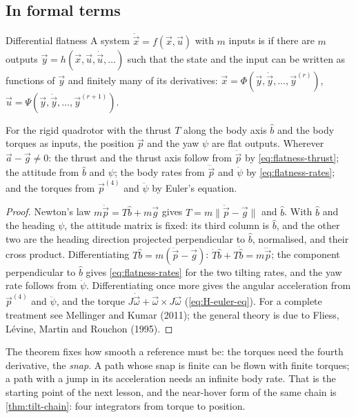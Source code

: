 \subsection{In formal terms}

\begin{definition}{Differential flatness}
A system $\dot{\vec x} = f(\vec x, \vec u)$ with $m$ inputs is  if there are $m$ outputs $\vec y = h(\vec x, \vec u, \dot{\vec u}, \dots)$ such that the state and the input can be written as functions of $\vec y$ and finitely many of its derivatives: $\vec x = \Phi(\vec y, \dot{\vec y}, \dots, \vec y^{(r)})$, $\vec u = \Psi(\vec y, \dot{\vec y}, \dots, \vec y^{(r+1)})$.
\end{definition}

\begin{theorem}
\label{thm:flatness-quad}
For the rigid quadrotor with the thrust $T$ along the body axis $\hat b$ and the body torques as inputs, the position $\vec p$ and the yaw $\psi$ are flat outputs. Wherever $\vec a - \vec g \ne 0$: the thrust and the thrust axis follow from $\ddot{\vec p}$ by \cref{eq:flatness-thrust}; the attitude from $\hat b$ and $\psi$; the body rates from $\dddot{\vec p}$ and $\dot\psi$ by \cref{eq:flatness-rates}; and the torques from $\vec p^{(4)}$ and $\ddot\psi$ by Euler's equation.
\end{theorem}
\begin{proof}
Newton's law $m\ddot{\vec p} = T\hat b + m\vec g$ gives $T = m\|\ddot{\vec p} - \vec g\|$ and $\hat b$. With $\hat b$ and the heading $\psi$, the attitude matrix is fixed: its third column is $\hat b$, and the other two are the heading direction projected perpendicular to $\hat b$, normalised, and their cross product. Differentiating $T\hat b = m(\ddot{\vec p} - \vec g)$: $\dot T\hat b + T\dot{\hat b} = m\dddot{\vec p}$; the component perpendicular to $\hat b$ gives \cref{eq:flatness-rates} for the two tilting rates, and the yaw rate follows from $\dot\psi$. Differentiating once more gives the angular acceleration from $\vec p^{(4)}$ and $\ddot\psi$, and the torque $J\dot{\vec\omega} + \vec\omega\times J\vec\omega$ (\cref{eq:H-euler-eq}). For a complete treatment see Mellinger and Kumar (2011); the general theory is due to Fliess, Lévine, Martin and Rouchon (1995).
\end{proof}

The theorem fixes how smooth a reference must be: the torques need the fourth derivative, the \emph{snap}. A path whose snap is finite can be flown with finite torques; a path with a jump in its acceleration needs an infinite body rate. That is the starting point of the next lesson, and the near-hover form of the same chain is \cref{thm:tilt-chain}: four integrators from torque to position.

